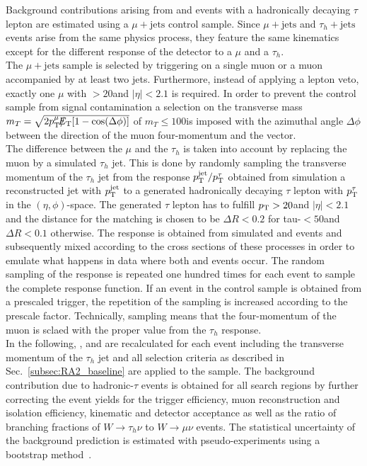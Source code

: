 Background contributions arising from \WJets and \ttbar events with a hadronically decaying $\tau$ lepton are estimated using a $\mu + \mathrm{jets}$ control sample. Since $\mu + \mathrm{jets}$ and $\tau_h + \mathrm{jets}$ events arise from the same physics process, they feature the same kinematics except for the different response of the detector to a $\mu$ and a $\tau_h$.  \\
The $\mu + \mathrm{jets}$ sample is selected by triggering on a single muon or a muon accompanied by at least two jets. Furthermore, instead of applying a lepton veto, exactly one $\mu$ with \pt$ > 20$\gev and $|\eta| < 2.1$ is required. In order to prevent the control sample from signal contamination a selection on the transverse mass $m_T = \sqrt{2p_{\text{T}}^{\mu}\slash\mkern-12mu{E}_{\text{T}}[1-\mathrm{cos(\Delta \phi)}]}$ of $m_T \le 100$\gev is imposed with the azimuthal angle $\Delta \phi$ between the direction of the muon four-momentum and the \met vector. \\
The difference between the $\mu$ and the $\tau_h$ is taken into account by replacing the muon by a simulated $\tau_h$ jet. This is done by randomly sampling the transverse momentum of the $\tau_h$ jet from the response $p_{\text{T}}^\mathrm{jet}/p_{\text{T}}^{\tau}$ obtained from simulation a reconstructed jet with $p_{\text{T}}^\mathrm{jet}$ to a generated hadronically decaying $\tau$ lepton with $p_{\text{T}}^{\tau}$ in the $(\eta, \phi)$-space. The generated $\tau$ lepton has to fulfill $p_{\text{T}} > 20$\gev and $|\eta| < 2.1$ and the distance for the matching is chosen to be $\Delta R < 0.2$ for tau-\pt$ < 50$\gev and $\Delta R < 0.1$ otherwise. The response is obtained from simulated \ttbar and \WJets events and subsequently mixed according to the cross sections of these processes in order to emulate what happens in data where both \ttbar and \WJets events occur. The random sampling of the response is repeated one hundred times for each event to sample the complete response function. If an event in the control sample is obtained from a prescaled trigger, the repetition of the sampling is increased according to the prescale factor. Technically, sampling means that the four-momentum of the muon is sclaed with the proper value from the $\tau_h$ response.  \\
In the following, \HT, \MHT and \NJets are recalculated for each event including the transverse momentum of the $\tau_h$ jet and all selection criteria as described in Sec.~\ref{subsec:RA2_baseline} are applied to the sample. The background contribution due to hadronic-$\tau$ events is obtained for all search regions by further correcting the event yields for the trigger efficiency, muon reconstruction and isolation efficiency, kinematic and detector acceptance as well as the ratio of branching fractions of $W \rightarrow \tau_h \nu$ to $W \rightarrow \mu \nu$ events. The statistical uncertainty of the background prediction is estimated with pseudo-experiments using a bootstrap method~\cite{GVK017474957}. \\
